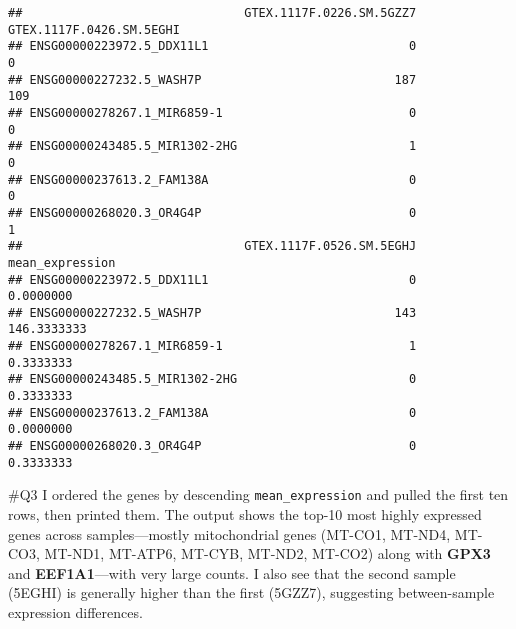 \documentclass[
]{article}
\newenvironment{Shaded}{\begin{snugshade}}{\end{snugshade}}
\newcommand{\CommentTok}[1]{\textcolor[rgb]{0.56,0.35,0.01}{\textit{#1}}}
\newcommand{\DecValTok}[1]{\textcolor[rgb]{0.00,0.00,0.81}{#1}}
\newcommand{\FunctionTok}[1]{\textcolor[rgb]{0.13,0.29,0.53}{\textbf{#1}}}
\newcommand{\NormalTok}[1]{#1}
\newcommand{\OtherTok}[1]{\textcolor[rgb]{0.56,0.35,0.01}{#1}}
\newcommand{\SpecialCharTok}[1]{\textcolor[rgb]{0.81,0.36,0.00}{\textbf{#1}}}
\begin{document}
\begin{verbatim}
##                               GTEX.1117F.0226.SM.5GZZ7 GTEX.1117F.0426.SM.5EGHI
## ENSG00000223972.5_DDX11L1                            0                        0
## ENSG00000227232.5_WASH7P                           187                      109
## ENSG00000278267.1_MIR6859-1                          0                        0
## ENSG00000243485.5_MIR1302-2HG                        1                        0
## ENSG00000237613.2_FAM138A                            0                        0
## ENSG00000268020.3_OR4G4P                             0                        1
##                               GTEX.1117F.0526.SM.5EGHJ mean_expression
## ENSG00000223972.5_DDX11L1                            0       0.0000000
## ENSG00000227232.5_WASH7P                           143     146.3333333
## ENSG00000278267.1_MIR6859-1                          1       0.3333333
## ENSG00000243485.5_MIR1302-2HG                        0       0.3333333
## ENSG00000237613.2_FAM138A                            0       0.0000000
## ENSG00000268020.3_OR4G4P                             0       0.3333333
\end{verbatim}

\#Q3 I ordered the genes by descending \texttt{mean\_expression} and
pulled the first ten rows, then printed them. The output shows the
top-10 most highly expressed genes across samples---mostly mitochondrial
genes (MT-CO1, MT-ND4, MT-CO3, MT-ND1, MT-ATP6, MT-CYB, MT-ND2, MT-CO2)
along with \textbf{GPX3} and \textbf{EEF1A1}---with very large counts. I
also see that the second sample (5EGHI) is generally higher than the
first (5GZZ7), suggesting between-sample expression differences.

\begin{Shaded}
\end{Shaded}
\end{document}
